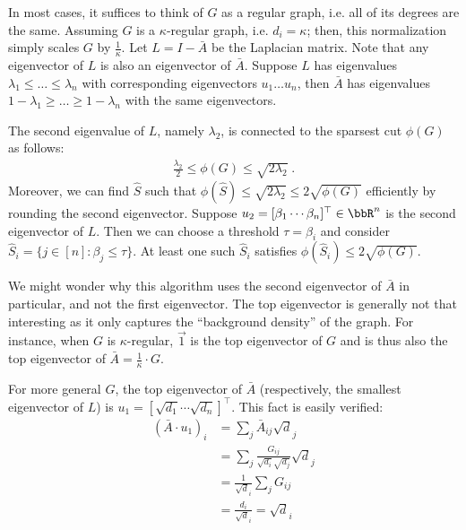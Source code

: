 In most cases, it suffices to think of $G$ as a regular graph, i.e. all of its degrees are the same. Assuming $G$ is a $\kappa$-regular graph, i.e. $d_i = \kappa$; then, this normalization simply scales $G$ by $\frac{1}{\kappa}$. Let $L = I - \bar{A}$ be the Laplacian matrix. Note that any eigenvector of $L$ is also an eigenvector of $\bar{A}$. Suppose $L$ has eigenvalues $\lambda_1 \leq \hdots \leq \lambda_n$ with corresponding eigenvectors $u_1 \hdots u_n$, then $\bar{A}$ has eigenvalues $1 - \lambda_1 \geq \hdots \geq 1 - \lambda_n$ with the same eigenvectors.

\begin{theorem}
The second eigenvalue of $L$, namely $\lambda_2$, is connected to the sparsest cut $\phi(G)$ as follows:
\begin{align}
    \frac{\lambda_2}{2} \leq \phi(G) \leq \sqrt{2 \lambda_2} \;.
\end{align}
Moreover, we can find $\hat{S}$ such that $\phi(\hat{S}) \leq \sqrt{2 \lambda_2} \leq 2 \sqrt{\phi(G)}$ efficiently by rounding the second eigenvector. Suppose $u_2 = [\beta_1 \cdots \beta_n]^\top \in \bbR^n$ is the second eigenvector of $L$. Then we can choose a threshold $\tau = \beta_i$ and consider $\hat{S}_i = \{ j \in [n] : \beta_j \leq \tau \}$. At least one such $\hat{S}_i$ satisfies $\phi(\hat{S}_i) \leq 2 \sqrt{\phi(G)}$.
\end{theorem}

\begin{remark}
We might wonder why this algorithm uses the second eigenvector of $\bar{A}$ in particular, and not the first eigenvector. The top eigenvector is generally not that interesting as it only captures the ``background density'' of the graph. For instance, when $G$ is $\kappa$-regular, $\vec{1}$ is the top eigenvector of $G$ and is thus also the top eigenvector of $\bar{A} = \frac{1}{\kappa} \cdot G$. 

For more general $G$, the top eigenvector of $\bar{A}$ (respectively, the smallest eigenvector of $L$) is $u_1 = [\sqrt{d_1} \cdots \sqrt{d_n}]^\top$. This fact is easily verified:
\begin{align}
    (\bar{A} \cdot u_1)_i &= \sum_j \bar{A}_{ij} \sqrt{d}_j \\
    &= \sum_j \frac{G_{ij}}{\sqrt{d_i}\sqrt{d_j}} \sqrt{d}_j \\
    &= \frac{1}{\sqrt{d}_i} \sum_j G_{ij} \\
    &= \frac{d_i}{\sqrt{d}_i} = \sqrt{d}_i
\end{align}

\end{remark}

